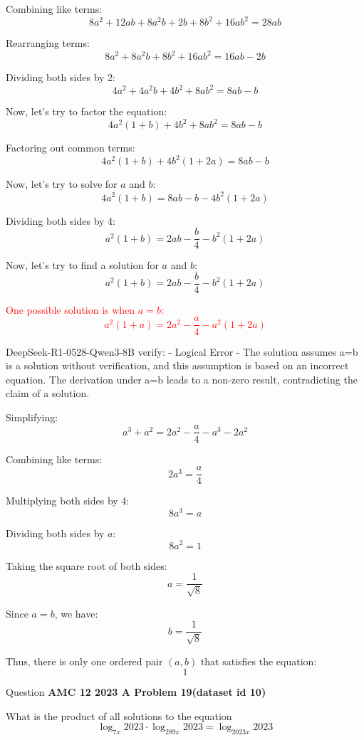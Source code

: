 \begin{tcolorbox}[
    colback=magenta!10, %
    colframe=magenta!80!black, %
]
Combining like terms:
\[8a^2 + 12ab + 8a^2b + 2b + 8b^2 + 16ab^2 = 28ab\]

Rearranging terms:
\[8a^2 + 8a^2b + 8b^2 + 16ab^2 = 16ab - 2b\]

Dividing both sides by 2:
\[4a^2 + 4a^2b + 4b^2 + 8ab^2 = 8ab - b\]

Now, let's try to factor the equation:
\[4a^2(1 + b) + 4b^2 + 8ab^2 = 8ab - b\]

Factoring out common terms:
\[4a^2(1 + b) + 4b^2(1 + 2a) = 8ab - b\]

Now, let's try to solve for $a$ and $b$:
\[4a^2(1 + b) = 8ab - b - 4b^2(1 + 2a)\]

Dividing both sides by 4:
\[a^2(1 + b) = 2ab - \frac{b}{4} - b^2(1 + 2a)\]

Now, let's try to find a solution for $a$ and $b$:
\[a^2(1 + b) = 2ab - \frac{b}{4} - b^2(1 + 2a)\]

\textcolor{red}{One possible solution is when $a = b$:
\[a^2(1 + a) = 2a^2 - \frac{a}{4} - a^2(1 + 2a)\]}

\begin{tcolorbox}[
    colback=blue!5!white,         %
    colframe=blue!40!white,       %
]
DeepSeek-R1-0528-Qwen3-8B verify: - Logical Error - The solution assumes a=b is a solution without verification, and this assumption is based on an incorrect equation. The derivation under a=b leads to a non-zero result, contradicting the claim of a solution.

\end{tcolorbox}


Simplifying:
\[a^3 + a^2 = 2a^2 - \frac{a}{4} - a^3 - 2a^2\]

Combining like terms:
\[2a^3 = \frac{a}{4}\]

Multiplying both sides by 4:
\[8a^3 = a\]

Dividing both sides by $a$:
\[8a^2 = 1\]

Taking the square root of both sides:
\[a = \frac{1}{\sqrt{8}}\]

Since $a = b$, we have:
\[b = \frac{1}{\sqrt{8}}\]

Thus, there is only one ordered pair $(a, b)$ that satisfies the equation:
\[\boxed{1}\]
\end{tcolorbox}


\begin{questionbox}{ Question }
\textbf{AMC 12 2023 A Problem 19(dataset id 10)}\footnotemark

What is the product of all solutions to the equation
\[\log_{7x}2023\cdot \log_{289x}2023=\log_{2023x}2023\]

\end{questionbox}

